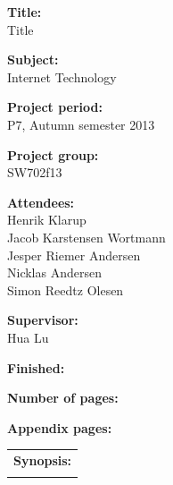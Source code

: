 \begin{titlingpage}
\begin{nopagebreak}
{\noindent\begin{minipage}[c]{0.4\textwidth}
	\begin{flushleft} 
	\begin{description}	
\item {\textbf{Title:}}\\
Title
\item {\textbf{Subject:}}\\
Internet Technology
\item {\textbf{Project period:}}\\
   P7, Autumn semester 2013\\
  \hspace{4cm}
\item {\textbf{Project group:}}\\
  SW702f13\\
  \hspace{4cm}
\item {\textbf{Attendees:}}\\
Henrik Klarup \\
Jacob Karstensen Wortmann \\
Jesper Riemer Andersen \\
Nicklas Andersen \\
Simon Reedtz Olesen \\

\item {\textbf{Supervisor:}}\\
Hua Lu \\
\end{description}

\begin{description}
\item {\textbf{Finished:}}
\item {\textbf{Number of pages:}} \pageref{lastpage}
\item {\textbf{Appendix pages:}} 
\end{description}
\vfill
	\end{flushleft}
\end{minipage}
\begin{minipage}[c]{0.6\textwidth}
	\begin{flushright} 
		  \vspace{.15cm}
  \hfill 
  \begin{tabular}{l}
  {\textbf{Synopsis:}}\bigskip \\
  \fbox{
    \parbox{5.5cm}{\bigskip
     {\vfill{\small 
     \bigskip}}
     }}
   \end{tabular}
	\end{flushright}
\end{minipage}

}
\end{nopagebreak}
\end{titlingpage}
